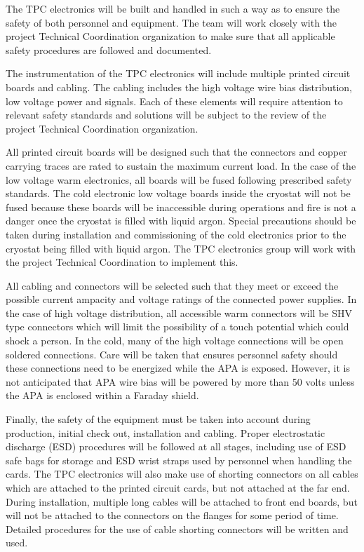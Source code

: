 The TPC electronics will be built and handled in such a way as to ensure the safety of both personnel and equipment.  The team will work closely with the project Technical Coordination organization to make sure that all applicable safety procedures are followed and documented.

The instrumentation of the TPC electronics will include multiple printed circuit boards and cabling.  The cabling includes the high voltage wire bias distribution, low voltage power and signals.  Each of these elements will require attention to relevant safety standards and solutions will be subject to the review of the project Technical Coordination organization.

All printed circuit boards will be designed such that the connectors and copper carrying traces are rated to sustain the maximum current load.  In the case of the low voltage warm electronics, all boards will be fused following prescribed safety standards.  The cold electronic low voltage boards inside the cryostat will not be fused because these boards will be inaccessible during operations and fire is not a danger once the cryostat is filled with liquid argon.  Special precautions should be taken during installation and commissioning of the cold electronics prior to the cryostat being filled with liquid argon.  The TPC electronics group will work with the project Technical Coordination to implement this.

All cabling and connectors will be selected such that they meet or exceed the possible current ampacity and voltage ratings of the connected power supplies.  In the case of high voltage distribution, all accessible warm connectors will be SHV type connectors which will limit the possibility of a touch potential which could shock a person.  In the cold, many of the high voltage connections will be open soldered connections. Care will be taken that ensures personnel safety should these connections need to be energized while the APA is exposed.  However, it is not anticipated that APA wire bias will be powered by more than 50 volts unless the APA is enclosed within a Faraday shield.

Finally, the safety of the equipment must be taken into account during production, initial check out, installation and cabling.  Proper electrostatic discharge (ESD) procedures will be followed at all stages, including use of ESD safe bags for storage and ESD wrist straps used by personnel when handling the cards.  The TPC electronics will also make use of shorting connectors on all cables which are attached to the printed circuit cards, but not attached at the far end.  During installation, multiple long cables will be attached to front end boards, but will not be attached to the connectors on the flanges for some period of time.  Detailed procedures for the use of cable shorting connectors will be written and used.

